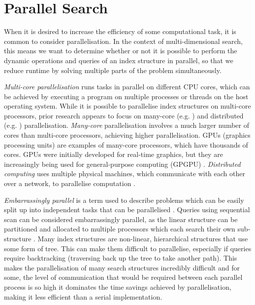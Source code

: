 \section{Parallel Search}

When it is desired to increase the efficiency of some computational task, it is common to consider parallelisation. In the context of multi-dimensional search, this means we want to determine whether or not it is possible to perform the dynamic operations and queries of an index structure in parallel, so that we reduce runtime by solving multiple parts of the problem simultaneously.

\textit{Multi-core parallelisation} runs tasks in parallel on different CPU cores, which can be achieved by executing a program on multiple processes or threads on the host operating system. While it is possible to parallelise index structures on multi-core processors, prior research appears to focus on many-core (e.g. \cite{btree-gpu1, btree-gpu2, btree-gpu3, traversing-spatial-indexes-gpu, rtree-gpu1, rtree-gpu2}) and distributed (e.g. \cite{fat-btree, distributed-kd-tree, distributed-md-search}) parallelisation. \textit{Many-core} parallelisation involves a much larger number of cores than multi-core processors, achieving higher parallelisation. GPUs (graphics processing units) are examples of many-core processors, which have thousands of cores. GPUs were initially developed for real-time graphics, but they are increasingly being used for general-purpose computing (GPGPU) \cite{performance-tuning-gpgpu}. \textit{Distributed computing} uses multiple physical machines, which communicate with each other over a network, to parallelise computation \cite{distributed-systems}.

\textit{Embarrassingly parallel} is a term used to describe problems which can be easily split up into independent tasks that can be parallelised \cite{designing-parallel-programs}. Queries using sequential scan can be considered embarrassingly parallel, as the linear structure can be partitioned and allocated to multiple processors which each search their own sub-structure \cite{gpu-gems-3}. Many index structures are non-linear, hierarchical structures that use some form of tree. This can make them difficult to parallelise, especially if queries require backtracking (traversing back up the tree to take another path). This makes the parallelisation of many search structures incredibly difficult and for some, the level of communication that would be required between each parallel process is so high it dominates the time savings achieved by parallelisation, making it less efficient than a serial implementation.

